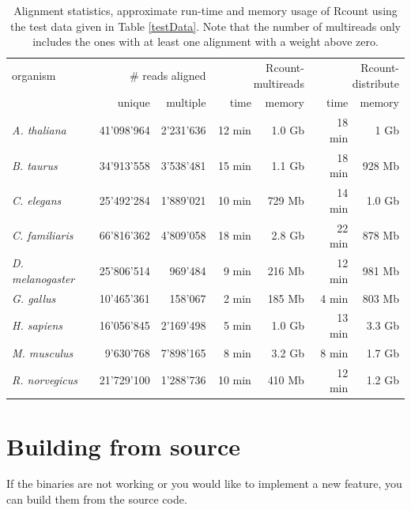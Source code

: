 \documentclass[a4paper,10pt]{article}
\begin{document}
\begin{table}[!h]
\centering
\caption{Alignment statistics, approximate run-time and memory usage of Rcount using the test data given in Table \ref{testData}. Note that the number of multireads only includes the ones with at least one alignment with a weight above zero.}\label{procData}
\vspace{8pt}
\begin{tabular}{l r r r r r r}
\hline
organism&\multicolumn{2}{r}{\# reads aligned}&\multicolumn{2}{r}{Rcount-multireads}&\multicolumn{2}{r}{Rcount-distribute}\\
&unique&multiple&time&memory&time&memory\\
\hline
\textit{A. thaliana}	&41'098'964	&2'231'636	&12 min	&1.0 Gb	&18 min	&1 Gb	\\
\textit{B. taurus}	&34'913'558	&3'538'481	&15 min	&1.1 Gb	&18 min	&928 Mb	\\
\textit{C. elegans}	&25'492'284	&1'889'021	&10 min	&729 Mb	&14 min	&1.0 Gb	\\
\textit{C. familiaris}	&66'816'362	&4'809'058	&18 min	&2.8 Gb	&22 min	&878 Mb	\\
\textit{D. melanogaster}&25'806'514	&969'484	&9 min	&216 Mb	&12 min	&981 Mb	\\
\textit{G. gallus}	&10'465'361	&158'067	&2 min	&185 Mb	&4 min	&803 Mb	\\
\textit{H. sapiens}	&16'056'845	&2'169'498	&5 min	&1.0 Gb	&13 min	&3.3 Gb	\\
\textit{M. musculus}	&9'630'768	&7'898'165	&8 min	&3.2 Gb	&8 min	&1.7 Gb	\\
\textit{R. norvegicus}	&21'729'100	&1'288'736	&10 min	&410 Mb	&12 min	&1.2 Gb	\\
\hline
\end{tabular}
\end{table}
\clearpage
\section{Building from source}\label{buildInstructions}
If the binaries are not working or you would like to implement a new feature, you can build them from the source code. 
\end{document}
